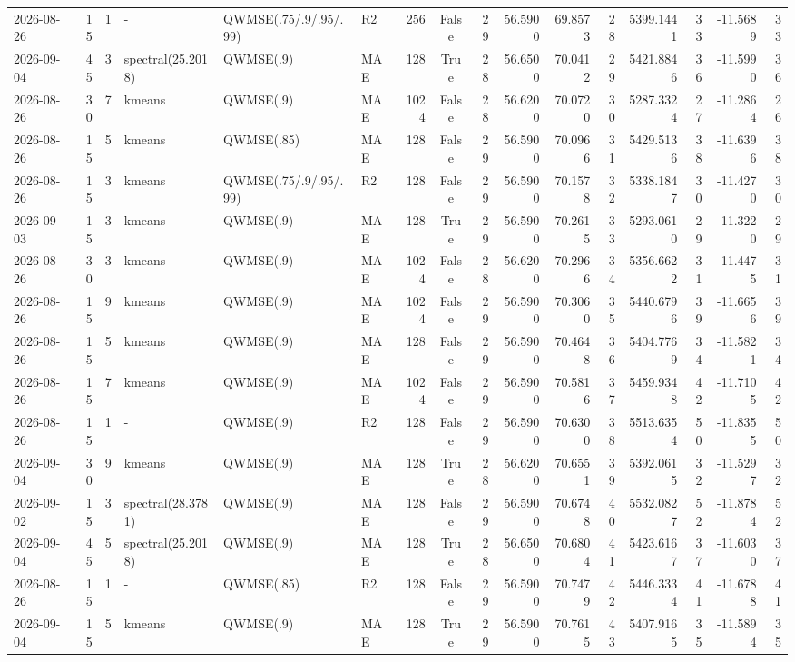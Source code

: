 \documentclass[10pt]{article}
\begin{document}
\begin{landscape}
\begin{longtable}{@{}lrrlllrcrrrrrrrr@{}}
2026-08-26 & 15 & 1 & - & QWMSE(.75/.9/.95/.99) & R2 & 256 & False & 29 & 56.5900 & 69.8573 & 28 & 5399.1441 & 33 & -11.5689 & 33 \\
2026-09-04 & 45 & 3 & spectral(25.2018) & QWMSE(.9) & MAE & 128 & True & 28 & 56.6500 & 70.0412 & 29 & 5421.8846 & 36 & -11.5990 & 36 \\
2026-08-26 & 30 & 7 & kmeans & QWMSE(.9) & MAE & 1024 & False & 28 & 56.6200 & 70.0720 & 30 & 5287.3324 & 27 & -11.2864 & 26 \\
2026-08-26 & 15 & 5 & kmeans & QWMSE(.85) & MAE & 128 & False & 29 & 56.5900 & 70.0966 & 31 & 5429.5136 & 38 & -11.6396 & 38 \\
2026-08-26 & 15 & 3 & kmeans & QWMSE(.75/.9/.95/.99) & R2 & 128 & False & 29 & 56.5900 & 70.1578 & 32 & 5338.1847 & 30 & -11.4270 & 30 \\
2026-09-03 & 15 & 3 & kmeans & QWMSE(.9) & MAE & 128 & True & 29 & 56.5900 & 70.2615 & 33 & 5293.0610 & 29 & -11.3220 & 29 \\
2026-08-26 & 30 & 3 & kmeans & QWMSE(.9) & MAE & 1024 & False & 28 & 56.6200 & 70.2966 & 34 & 5356.6622 & 31 & -11.4475 & 31 \\
2026-08-26 & 15 & 9 & kmeans & QWMSE(.9) & MAE & 1024 & False & 29 & 56.5900 & 70.3060 & 35 & 5440.6796 & 39 & -11.6656 & 39 \\
2026-08-26 & 15 & 5 & kmeans & QWMSE(.9) & MAE & 128 & False & 29 & 56.5900 & 70.4648 & 36 & 5404.7769 & 34 & -11.5821 & 34 \\
2026-08-26 & 15 & 7 & kmeans & QWMSE(.9) & MAE & 1024 & False & 29 & 56.5900 & 70.5816 & 37 & 5459.9348 & 42 & -11.7105 & 42 \\
2026-08-26 & 15 & 1 & - & QWMSE(.9) & R2 & 128 & False & 29 & 56.5900 & 70.6300 & 38 & 5513.6354 & 50 & -11.8355 & 50 \\
2026-09-04 & 30 & 9 & kmeans & QWMSE(.9) & MAE & 128 & True & 28 & 56.6200 & 70.6551 & 39 & 5392.0615 & 32 & -11.5297 & 32 \\
2026-09-02 & 15 & 3 & spectral(28.3781) & QWMSE(.9) & MAE & 128 & False & 29 & 56.5900 & 70.6748 & 40 & 5532.0827 & 52 & -11.8784 & 52 \\
2026-09-04 & 45 & 5 & spectral(25.2018) & QWMSE(.9) & MAE & 128 & True & 28 & 56.6500 & 70.6804 & 41 & 5423.6167 & 37 & -11.6030 & 37 \\
2026-08-26 & 15 & 1 & - & QWMSE(.85) & R2 & 128 & False & 29 & 56.5900 & 70.7479 & 42 & 5446.3334 & 41 & -11.6788 & 41 \\
2026-09-04 & 15 & 5 & kmeans & QWMSE(.9) & MAE & 128 & True & 29 & 56.5900 & 70.7615 & 43 & 5407.9165 & 35 & -11.5894 & 35 \\

\end{longtable}
\end{landscape}
\end{document}
